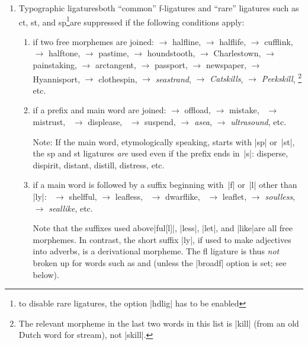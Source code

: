 \documentclass[11pt]{article}
\begin{document}
\begin{enumerate}
\item
Typographic ligatures\textemdash both \enquote{common} f-ligatures and \enquote{rare} ligatures such as ct, st, and sp\footnote{to disable rare ligatures, the option |hdlig| has to be enabled}\textemdash are suppressed if the following conditions apply:
\begin{enumerate}
\item if two free morphemes are joined: 
 $\to$ halfline, 
 $\to$ halflife, 
 $\to$ cufflink, 
 $\to$ halftone, 
 $\to$ pastime,
 $\to$ houndstooth, 
 $\to$ Charlestown, 
 $\to$ painstaking,
 $\to$ arctangent, 
 $\to$ passport,
 $\to$ newspaper, 
 $\to$ Hyannisport,  
 $\to$ clothespin, 
\emph{} $\to$ \emph{seastrand}, 
\emph{\ebg {} $\to$ Catskills}, 
\emph{\ebg {} $\to$ Peekskill},%
\footnote{The relevant morpheme in the last two words in this list is |kill| (from an old Dutch word for stream), not |skill|.} etc.

\item if a prefix and main word are joined: 
 $\to$ offload, 
 $\to$ mistake,
~$\to$ mistrust, 
~$\to$ displease, 
~$\to$ suspend, 
\emph{ $\to$ asea}, 
\emph{ $\to$ ultrasound}, 
etc. 

Note: If the main word, etymologically speaking, starts with |sp| or~|st|, the sp and st ligatures \emph{are} used even if the prefix ends in~|s|: disperse, dispirit, distant, distill, distress, etc. 

\item if a main word is followed by a suffix beginning with~|f| or~|l| other than |ly|: ~$\to$ shelfful, 
 $\to$ leafless, 
~$\to$ dwarflike, 
~$\to$ leaflet, 
\emph{ $\to$ soulless}, 
\emph{ $\to$ seallike}, 
etc. 


Note that the suffixes used above\textemdash |ful[l]|, |less|, |let|, and |like|\textemdash are all free morphemes. In contrast, the short suffix |ly|, if used to make adjectives into adverbs, is a derivational morpheme. The fl ligature is thus \emph{not} broken up for words such as  and  (unless the |broadf| option is set; see below).


\end{enumerate}
\end{enumerate}
\end{document}
